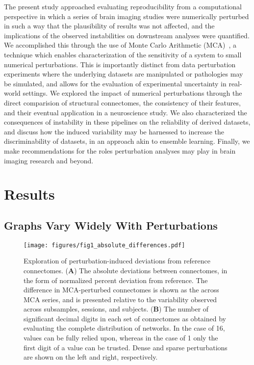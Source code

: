 \documentclass[fleqn,10pt]{SelfArx} %
\newcommand{\new}[1]{{#1}}
\begin{document}
The present study approached evaluating reproducibility from a computational perspective in which a series of brain
imaging studies were numerically perturbed \new{in} such \new{a way} that the plausibility of results was not affected, and the
implications of the observed instabilities \new{on downstream analyses} were quantified. We accomplished this through the use of Monte Carlo
Arithmetic (MCA)~\cite{Parker1997-qq,Denis2016-wo}, a technique which enables characterization of the sensitivity of a system to
small \new{numerical} perturbations. \new{This is importantly distinct from data perturbation experiments where the underlying
datasets are manipulated or pathologies may be simulated, and allows for the evaluation of experimental uncertainty in real-world
settings.} We explored the impact of \new{numerical} perturbations through the direct comparision of structural connectomes,
the consistency of their features, and their eventual application in a neuroscience study. \new{We also characterized the}
consequences \new{of instability in these pipelines on the reliability of derived datasets,} and \new{discuss how the induced
variability may be harnessed to increase the discriminability of datasets, in an approach akin to ensemble learning}.
\new{Finally, we} make recommendations for the roles \new{perturbation} analyses may play in brain imaging research \new{and beyond}.

\section*{Results}
\subsection*{Graphs Vary Widely With Perturbations}
\begin{figure*}[hbt]\centering
\texttt{[image: figures/fig1\_absolute\_differences.pdf]}
\caption{Exploration of perturbation-induced deviations from reference connectomes.
(\textbf{A}) The absolute deviations \new{between connectomes}, in the form of normalized percent deviation from
reference. \new{The difference in MCA-perturbed connectomes is} shown as the across MCA series, \new{and is presented}
relative to \new{the variability observed} across subsamples, sessions, and subjects.
(\textbf{B}) The number of significant decimal digits in each set of connectomes as obtained \new{by} evaluating the
\new{complete distribution of networks}. In the case of 16, values can be fully relied upon, whereas in the case of 1 only the first
digit of a value can be trusted. \new{Dense} and \new{sparse} perturbations are shown on the left and right, respectively.}
\label{fig:absolute}
\end{figure*}
\end{document}
